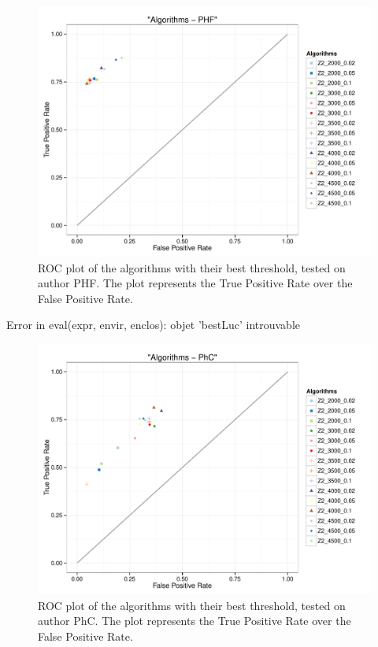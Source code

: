\documentclass{article}\usepackage[]{graphicx}\usepackage[]{color}
\begin{document}
\begin{Schunk}
\begin{figure}
\includegraphics[width=\textwidth]{figures/theme-bestPHFplot-1} \caption[ROC plot of the algorithms with their best threshold, tested on author PHF]{ROC plot of the algorithms with their best threshold, tested on author PHF. The plot represents the True Positive Rate over the False Positive Rate.}\label{fig:bestPHFplot}
\end{figure}
\end{Schunk}
\begin{Schunk}
\begin{Soutput}
Error in eval(expr, envir, enclos): objet 'bestLuc' introuvable
\end{Soutput}
\end{Schunk}
\begin{Schunk}
\begin{figure}
\includegraphics[width=\textwidth]{figures/theme-bestPhCplot-1} \caption[ROC plot of the algorithms with their best threshold, tested on author PhC]{ROC plot of the algorithms with their best threshold, tested on author PhC. The plot represents the True Positive Rate over the False Positive Rate.}\label{fig:bestPhCplot}
\end{figure}
\end{Schunk}
\end{document}
